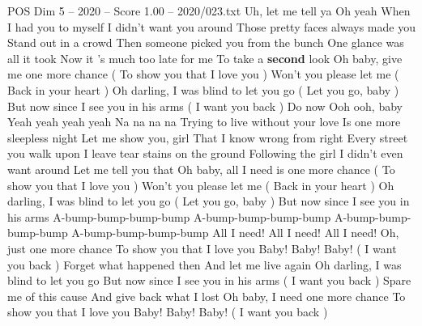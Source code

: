 \begin{textsample}{POS Dim 5 – 2020 – Score 1.00 – 2020/023.txt}  \label{ex:f5_pos_027}
Uh, let me tell ya Oh yeah When I had you to myself I didn't want you around Those pretty faces always made you Stand out in a crowd Then someone picked you from the bunch One glance was all it took Now it 's much too late for me To take a \textbf{second} look Oh baby, give me one more chance ( To show you that I love you ) Won't you please let me ( Back in your heart ) Oh darling, I was blind to let you go ( Let you go, baby ) But now since I see you in his arms ( I want you back ) Do now Ooh ooh, baby Yeah yeah yeah yeah Na na na na Trying to live without your love Is one more sleepless night Let me show you, girl That I know wrong from right Every street you walk upon I leave tear stains on the ground Following the girl I didn't even want around Let me tell you that Oh baby, all I need is one more chance ( To show you that I love you ) Won't you please let me ( Back in your heart ) Oh darling, I was blind to let you go ( Let you go, baby ) But now since I see you in his arms A-bump-bump-bump-bump A-bump-bump-bump-bump A-bump-bump-bump-bump A-bump-bump-bump-bump All I need!
All I need!
All I need!
Oh, just one more chance To show you that I love you Baby!
Baby!
Baby! ( I want you back ) Forget what happened then And let me live again Oh darling, I was blind to let you go But now since I see you in his arms ( I want you back ) Spare me of this cause And give back what I lost Oh baby, I need one more chance To show you that I love you Baby!
Baby!
Baby! ( I want you back )

\end{textsample}

